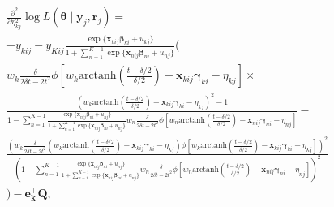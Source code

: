 \documentclass[12pt, %
               openright, %
               oneside, %
               a4paper, %
               chapter=TITLE, %
               section=TITLE, %
               brazil,
               english %
]{abntex2}
\begin{document}
\begin{apendicesenv}
\begin{align*}
  &\frac{\partial^{2}}{\partial \eta_{kj}^{2}}
    \log L(\bm{\theta}\mid\bm{y}_{j}, \bm{r}_{j}) =\\
  &- y_{kij} - y_{Kij}
    \frac{\exp\{\bm{x}_{kij} \bm{\beta}_{ki} + u_{kj}\}}{1 +
    \sum_{n = 1}^{K-1}\exp\{\bm{x}_{nij} \bm{\beta}_{ni} + u_{nj}\}}\Bigg(\\
  &w_{k}\frac{\delta}{2\delta t - 2t^{2}}
    \phi[w_{k}\text{arctanh}\left(\frac{t-\delta/2}{\delta/2}\right)
    - \bm{x}_{kij}\bm{\gamma}_{ki} - \eta_{kj}]\times\\
  &\frac{\left(
    w_{k} \text{arctanh}\left(\frac{t-\delta/2}{\delta/2}\right)
    - \bm{x}_{kij}\bm{\gamma}_{ki} - \eta_{kj}
    \right)^{2} - 1}{
    1 - \sum_{n = 1}^{K-1}
    \frac{\exp\{\bm{x}_{nij}\bm{\beta}_{ni} + u_{nj}\}}{1 +
    \sum_{n = 1}^{K-1}\exp\{\bm{x}_{nij} \bm{\beta}_{ni} + u_{nj}\}}
    w_{n}\frac{\delta}{2\delta t - 2t^{2}}
    \phi[w_{n}\text{arctanh}\left(\frac{t-\delta/2}{\delta/2}\right)
    - \bm{x}_{nij}\bm{\gamma}_{ni} - \eta_{nj}]} -\\
  &\frac{\left(
    w_{k}\frac{\delta}{2\delta t - 2t^{2}}
    (w_{k}\text{arctanh}\left(\frac{t-\delta/2}{\delta/2}\right)
    - \bm{x}_{kij}\bm{\gamma}_{ki} - \eta_{kj})
    \phi[w_{k}\text{arctanh}\left(\frac{t-\delta/2}{\delta/2}\right)
    - \bm{x}_{kij}\bm{\gamma}_{ki} - \eta_{kj}]\right)^{2}}{\left(1 -
    \sum_{n = 1}^{K-1}
    \frac{\exp\{\bm{x}_{nij} \bm{\beta}_{ni} + u_{nj}\}}{1 +
    \sum_{n = 1}^{K-1}\exp\{\bm{x}_{nij} \bm{\beta}_{ni} + u_{nj}\}}
    w_{n}\frac{\delta}{2\delta t - 2t^{2}}
    \phi[w_{n}\text{arctanh}\left(\frac{t-\delta/2}{\delta/2}\right)
    - \bm{x}_{nij}\bm{\gamma}_{ni} - \eta_{nj}]\right)^{2}}\\
  &\Bigg) - \bm{e_{k}^{\top}Q},
\end{align*}


\end{apendicesenv}
\end{document}
